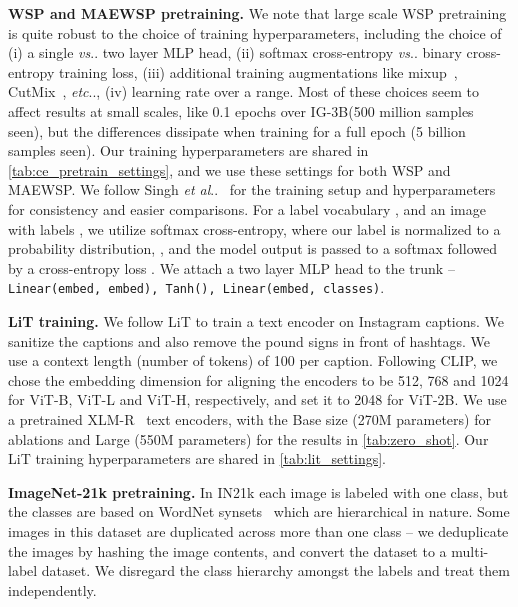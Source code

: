 \documentclass[10pt,twocolumn,letterpaper]{article}
\makeatletter
\DeclareRobustCommand\onedot{\futurelet\@let@token\@onedot}
\def\@onedot{\ifx\@let@token.\else.\null\fi\xspace}
\def\etc{\emph{etc}\onedot} \def\vs{\emph{vs}\onedot}
\def\etal{\emph{et al}\onedot}
\newcommand{\lit}{LiT\xspace}
\newcommand{\ce}{WSP\xspace}
\newcommand{\ours}{MAEWSP\xspace}  \newcommand{\oursig}{\ours{}\textsubscript{IG}\xspace}
\newcommand{\clip}{CLIP\xspace}
\newcommand{\xlmr}{XLM-R\xspace}
\newcommand{\vitB}{ViT-B\xspace}
\newcommand{\vitL}{ViT-L\xspace}
\newcommand{\vitH}{ViT-H\xspace}
\newcommand{\vitTwoB}{ViT-2B\xspace}
\newcommand{\igSizeShort}{IG-3B\xspace}
\newcommand{\ig}{Instagram\xspace}
\newcommand{\inetFull}{ImageNet-21k\xspace}
\newcommand{\inetFullShort}{IN21k\xspace}
\makeatother
\begin{document}
{\bf \noindent \ce and \ours pretraining.}
We note that large scale \ce pretraining is quite robust to the choice of training hyperparameters, including the choice of
(i) a single \vs two layer MLP head, (ii) softmax cross-entropy \vs binary cross-entropy training loss, (iii) additional training
augmentations like mixup~\cite{zhang2017mixup}, CutMix~\cite{yun2019cutmix}, \etc, (iv) learning rate over a  range.
Most of these choices seem to affect results at small scales, like 0.1 epochs over \igSizeShort (500 million samples seen), but the
differences dissipate when training for a full epoch (5 billion samples seen). Our training hyperparameters are shared in
\cref{tab:ce_pretrain_settings}, and we use these settings for both \ce and \ours.
We follow Singh \etal~\cite{singh2022revisiting} for the training setup and hyperparameters for consistency and easier comparisons.
For a label vocabulary , and an image  with labels , we utilize softmax cross-entropy,
where our label is normalized to a probability
distribution, , and the model output is passed to a softmax followed by a cross-entropy loss
\cite{singh2022revisiting, mahajan2018exploring}.
We attach a two layer MLP head to the trunk -- \texttt{\small 
    Linear(embed, embed), Tanh(), Linear(embed, classes)}.



{\bf \noindent \lit training.} We follow \lit to train a text encoder on \ig captions.
We sanitize the captions and also remove the pound signs in front of hashtags.
We use a context length (number of tokens) of 100 per caption. Following \clip, we chose the embedding dimension
for aligning the encoders to be 512, 768 and 1024 for \vitB, \vitL and \vitH, respectively, and set it to 2048 for \vitTwoB. 
We use a pretrained \xlmr~\cite{conneau2020unsupervised} text encoders, with the Base size (270M parameters) for ablations and
Large (550M parameters) for the results in \cref{tab:zero_shot}. Our \lit training hyperparameters are shared in 
\cref{tab:lit_settings}.



{\bf \noindent \inetFull pretraining.}
In \inetFullShort each image is labeled with one class, but the classes are based on WordNet synsets~\cite{miller1995wordnet} which are hierarchical in nature.
Some images in this dataset are duplicated across
more than one class -- we deduplicate the images by hashing the image contents, and
convert the dataset to a multi-label dataset.
We disregard the class hierarchy amongst the labels and treat them independently.
\end{document}
